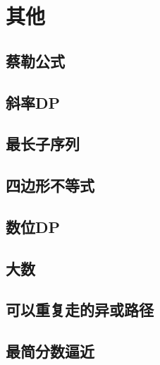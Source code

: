 \documentclass[main.tex]{subfiles}
\begin{document}
\chapter{其他}
\section{蔡勒公式}
    
\section{斜率DP}
    
\section{最长子序列}
    
\section{四边形不等式}
    
\section{数位DP}
    
\section{大数}
    
\section{可以重复走的异或路径}
    
\section{最简分数逼近}
    
\end{document}
